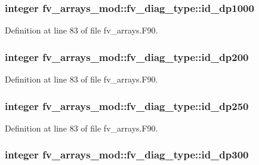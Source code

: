 \subsubsection[{id\-\_\-dp1000}]{\setlength{\rightskip}{0pt plus 5cm}integer fv\-\_\-arrays\-\_\-mod\-::fv\-\_\-diag\-\_\-type\-::id\-\_\-dp1000}\label{structfv__arrays__mod_1_1fv__diag__type_a96412203d65812e83b593da8035117ad}


Definition at line 83 of file fv\-\_\-arrays.\-F90.

\subsubsection[{id\-\_\-dp200}]{\setlength{\rightskip}{0pt plus 5cm}integer fv\-\_\-arrays\-\_\-mod\-::fv\-\_\-diag\-\_\-type\-::id\-\_\-dp200}\label{structfv__arrays__mod_1_1fv__diag__type_a6f55e52f00ad261c77881a09af71acad}


Definition at line 83 of file fv\-\_\-arrays.\-F90.

\subsubsection[{id\-\_\-dp250}]{\setlength{\rightskip}{0pt plus 5cm}integer fv\-\_\-arrays\-\_\-mod\-::fv\-\_\-diag\-\_\-type\-::id\-\_\-dp250}\label{structfv__arrays__mod_1_1fv__diag__type_a5e8d330356a3bceb251e0922e4736c89}


Definition at line 83 of file fv\-\_\-arrays.\-F90.

\subsubsection[{id\-\_\-dp300}]{\setlength{\rightskip}{0pt plus 5cm}integer fv\-\_\-arrays\-\_\-mod\-::fv\-\_\-diag\-\_\-type\-::id\-\_\-dp300}\label{structfv__arrays__mod_1_1fv__diag__type_a3591f5de65f47909773e8b2a99e31a54}


